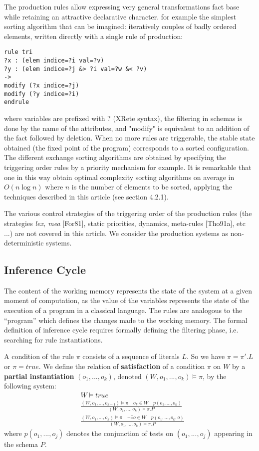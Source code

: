 The production rules allow expressing very general transformations
fact base while retaining an attractive declarative character. for example
the simplest sorting algorithm that can be imagined: iteratively
couples of badly ordered elements, written directly with a single rule of
production:
\begin{verbatim}
rule tri
?x : (elem indice=?i val=?v)
?y : (elem indice=?j &> ?i val=?w &< ?v)
->
modify (?x indice=?j)
modify (?y indice=?i)
endrule
\end{verbatim}
where variables are prefixed with ? (XRete syntax), the filtering in schemas is done
by the name of the attributes, and "modify" is equivalent to an addition of the fact followed by deletion.
When no more rules are triggerable, the stable state
obtained (the fixed point of the program) corresponds to a sorted configuration. The different
exchange sorting algorithms are obtained by specifying the triggering order
rules by a priority mechanism for example. It is remarkable that one
in this way obtain optimal complexity sorting algorithms on average
in $O(n  \log {n})$ where $n$ is the number of elements to be sorted, applying the techniques
described in this article (see section 4.2.1).

The various control strategies of the triggering order of the production rules
(the strategies \textit{lex, mea} [For81], static priorities, dynamics, meta-rules [Tho91a],
etc ...) are not covered in this article. We consider the production systems
as non-deterministic systems.

\subsection{Inference Cycle}

The content of the working memory represents the state of the system at a given moment
of computation, as the value of the variables represents the state of the execution of a program in a classical language. The rules are analogous to the ``program'' which
defines the changes made to the working memory. The formal definition of
inference cycle requires formally defining the filtering phase, i.e.
searching for rule instantiations.

A condition of the rule $\pi$ consists of a sequence of literals $L$. So we have
$\pi = \pi' . L$ or $\pi = true$.  We define the relation of \textbf{satisfaction} of a condition $\pi$ on
$W$ by a \textbf{partial instantiation} $(o_1, ..., o_k)$, denoted $(W, o_1, ..., o_k) \vDash \pi$, by the
following system:
\begin{eqnarray}
& W \vDash true \\
& \displaystyle \frac{(W, o_1, ..., o_{k-1}) \vDash \pi \quad o_k \in W \quad p(o_1, ... , o_k)}
{(W, o_1, ..., o_k) \vDash \pi . P} \\
& \displaystyle \frac{(W, o_1, ..., o_k) \vDash \pi \quad \neg \exists o \in W \quad p(o_1, ... , o_k, o)}
{(W, o_1, ..., o_k) \vDash \pi . P}
\end{eqnarray}
where $p(o_1, ..., o_j)$ denotes the conjunction of tests on $(o_1, ..., o_j)$ appearing in the
schema $P$.

